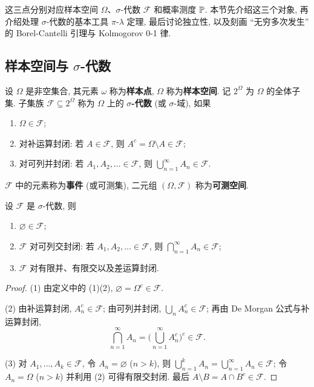 这三点分别对应样本空间 $\Omega$、$\sigma$-代数 $\mathcal{F}$ 和概率测度 $\P$. 本节先介绍这三个对象, 再介绍处理 $\sigma$-代数的基本工具 $\pi$-$\lambda$ 定理, 最后讨论独立性, 以及刻画 ``无穷多次发生'' 的 Borel-Cantelli 引理与 Kolmogorov 0-1 律.

\subsection{样本空间与 \texorpdfstring{$\sigma$}{sigma}-代数}

\begin{definition}\label{def:sigma-algebra}
设 $\Omega$ 是非空集合, 其元素 $\omega$ 称为\textbf{样本点}, $\Omega$ 称为\textbf{样本空间}. 记 $2^\Omega$ 为 $\Omega$ 的全体子集. 子集族 $\mathcal{F}\subseteq 2^\Omega$ 称为 $\Omega$ 上的 \textbf{$\sigma$-代数} (或 $\sigma$-域), 如果
\begin{enumerate}
\item $\Omega\in\mathcal{F}$;
\item 对补运算封闭: 若 $A\in\mathcal{F}$, 则 $A^c=\Omega\setminus A\in\mathcal{F}$;
\item 对可列并封闭: 若 $A_1,A_2,\dots\in\mathcal{F}$, 则 $\bigcup_{n=1}^\infty A_n\in\mathcal{F}$.
\end{enumerate}
$\mathcal{F}$ 中的元素称为\textbf{事件} (或可测集), 二元组 $(\Omega,\mathcal{F})$ 称为\textbf{可测空间}.
\end{definition}

\begin{proposition}\label{prop:sigma-closure}
设 $\mathcal{F}$ 是 $\sigma$-代数, 则
\begin{enumerate}
\item $\varnothing\in\mathcal{F}$;
\item $\mathcal{F}$ 对可列交封闭: 若 $A_1,A_2,\dots\in\mathcal{F}$, 则 $\bigcap_{n=1}^\infty A_n\in\mathcal{F}$;
\item $\mathcal{F}$ 对有限并、有限交以及差运算封闭.
\end{enumerate}
\end{proposition}

\begin{proof}
(1) 由定义中的 (1)(2), $\varnothing=\Omega^c\in\mathcal{F}$.

(2) 由补运算封闭, $A_n^c\in\mathcal{F}$; 由可列并封闭, $\bigcup_n A_n^c\in\mathcal{F}$; 再由 De Morgan 公式与补运算封闭,
\[
\bigcap_{n=1}^\infty A_n=\Big(\bigcup_{n=1}^\infty A_n^c\Big)^c\in\mathcal{F}.
\]

(3) 对 $A_1,\dots,A_k\in\mathcal{F}$, 令 $A_n=\varnothing$ ($n>k$), 则 $\bigcup_{n=1}^k A_n=\bigcup_{n=1}^\infty A_n\in\mathcal{F}$; 令 $A_n=\Omega$ ($n>k$) 并利用 (2) 可得有限交封闭. 最后 $A\setminus B=A\cap B^c\in\mathcal{F}$.
\end{proof}

